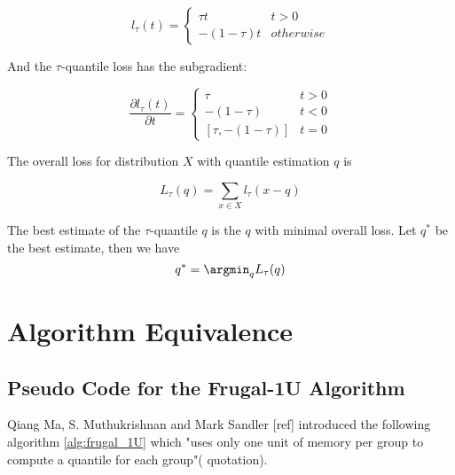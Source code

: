 \begin{equation}
    l_\tau(t)= 
        \begin{cases}
            \tau t & t > 0\\
            -(1-\tau) t & otherwise
        \end{cases}
\end{equation}


And the $\tau$-quantile loss has the {\color{red} subgradient}:

\begin{equation}
    \frac {\partial l_\tau(t)}{\partial t}= 
        \begin{cases}
            \tau                & t > 0\\
            -(1-\tau)           & t < 0\\
            [\tau, -(1 - \tau)] & t = 0
        \end{cases}
\end{equation}



The overall loss for distribution $X$ with quantile estimation $q$ is

\begin{equation}
    L_{\tau}(q) = \sum_{x \in X} l_{\tau}(x - q)
\end{equation}


The best estimate of the $\tau$-quantile $q$ is the $q$ with minimal overall loss. 
Let $q^\ast$ be the best estimate, then we have
\begin{equation}
    q^\ast = \argmin_{q} L_{\tau}(q)
\end{equation}



\section{Algorithm Equivalence}

\subsection{Pseudo Code for the Frugal-1U Algorithm}

Qiang Ma, S. Muthukrishnan and Mark Sandler {\color{red} [ref]}  
introduced the following algorithm \ref{alg:frugal_1U} which 
"uses only one unit of memory per group to compute a quantile for each group"({\color{blue} quotation}).

